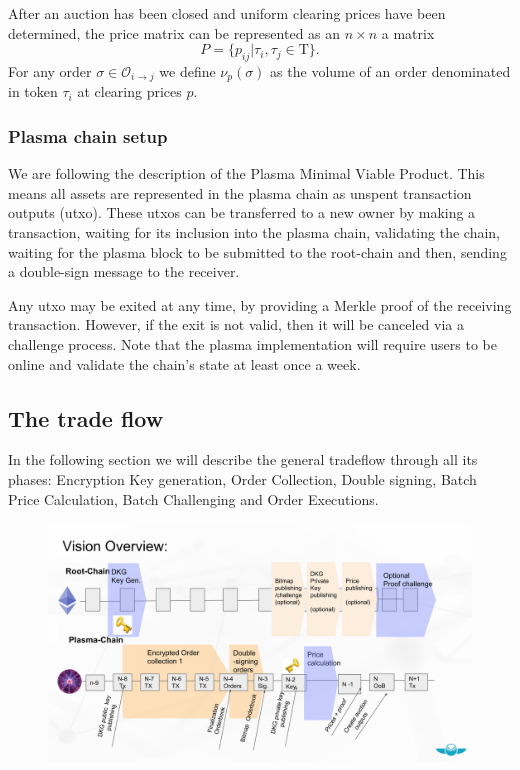 \documentclass[11pt,parskip=full]{scrartcl}%
\newcommand{\Tau}{\mathrm{T}}
\def\pO{\mathcal{O}}
\def\ra{\rightarrow}
\begin{document}
After an auction has been closed and uniform clearing prices have been determined, the price matrix can be represented as an $n\times n$ a matrix 
\[P = \{p_{ij}| \tau_i, \tau_j \in \Tau \}.\]
For any order $\sigma \in \pO_{i\ra j}$ we define $\nu_p(\sigma)$ as the volume of an order denominated in token $\tau_i$ at clearing prices $p$.


\subsubsection{Plasma chain setup}
We are following the description of the Plasma Minimal Viable Product\cite{MVP}. 
This means all assets are represented in the plasma chain as unspent transaction outputs (utxo). 
These utxos can be transferred to a new owner by making a transaction, waiting for its inclusion into the plasma chain, validating the chain, waiting for the plasma block to be submitted to the root-chain and then, sending a double-sign message to the receiver. 

Any utxo may be exited at any time, by providing a Merkle proof of the receiving transaction. 
However, if the exit is not valid, then it will be canceled via a challenge process.
Note that the plasma implementation will require users to be online and validate the chain's state at least once a week.


\subsection{The trade flow}
\label{subsec:data}

In the following section we will describe the general tradeflow through all its phases: Encryption Key generation, Order Collection, Double signing, Batch Price Calculation, Batch Challenging and Order Executions.

\begin{figure}
\centering
\includegraphics[width=\textwidth]{overview_tradeflow.png}
\end{figure}
\end{document}
